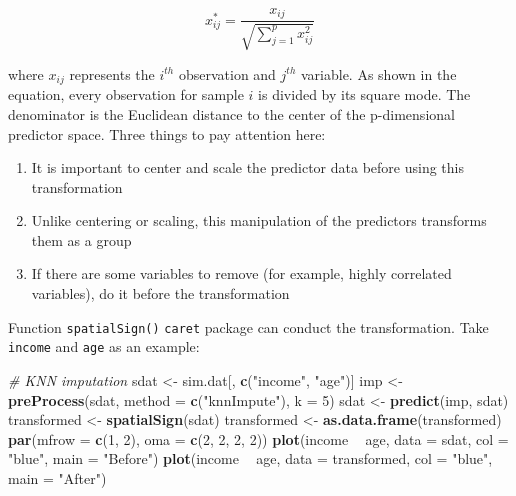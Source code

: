\documentclass[12pt,]{krantz}
\makeatletter
\newenvironment{Shaded}{\begin{snugshade}}{\end{snugshade}}
\newcommand{\CommentTok}[1]{\textcolor[rgb]{0.37,0.37,0.37}{\textit{#1}}}
\newcommand{\DataTypeTok}[1]{\textcolor[rgb]{0.27,0.27,0.27}{#1}}
\newcommand{\DecValTok}[1]{\textcolor[rgb]{0.06,0.06,0.06}{#1}}
\newcommand{\KeywordTok}[1]{\textcolor[rgb]{0.27,0.27,0.27}{\textbf{#1}}}
\newcommand{\NormalTok}[1]{#1}
\newcommand{\OperatorTok}[1]{\textcolor[rgb]{0.43,0.43,0.43}{\textbf{#1}}}
\newcommand{\StringTok}[1]{\textcolor[rgb]{0.5,0.5,0.5}{#1}}
\providecommand{\tightlist}{%
  \setlength{\itemsep}{0pt}\setlength{\parskip}{0pt}}
\newenvironment{kframe}{%
\medskip{}
\setlength{\fboxsep}{.8em}
 \def\at@end@of@kframe{}%
 \ifinner\ifhmode%
  \def\at@end@of@kframe{\end{minipage}}%
  \begin{minipage}{\columnwidth}%
 \fi\fi%
 \def\FrameCommand##1{\hskip\@totalleftmargin \hskip-\fboxsep
 \colorbox{shadecolor}{##1}\hskip-\fboxsep
     \hskip-\linewidth \hskip-\@totalleftmargin \hskip\columnwidth}%
 \MakeFramed {\advance\hsize-\width
   \@totalleftmargin\z@ \linewidth\hsize
   \@setminipage}}%
 {\par\unskip\endMakeFramed%
 \at@end@of@kframe}
\renewenvironment{Shaded}{\begin{kframe}}{\end{kframe}}
\makeatother
\begin{document}
\[x_{ij}^{*}=\frac{x_{ij}}{\sqrt{\sum_{j=1}^{p}x_{ij}^{2}}}\]

where \(x_{ij}\) represents the \(i^{th}\) observation and \(j^{th}\) variable. As shown in the equation, every observation for sample \(i\) is divided by its square mode. The denominator is the Euclidean distance to the center of the p-dimensional predictor space. Three things to pay attention here:

\begin{enumerate}
\def\labelenumi{\arabic{enumi}.}
\tightlist
\item
  It is important to center and scale the predictor data before using this transformation
\item
  Unlike centering or scaling, this manipulation of the predictors transforms them as a group
\item
  If there are some variables to remove (for example, highly correlated variables), do it before the transformation
\end{enumerate}

Function \texttt{spatialSign()} \texttt{caret} package can conduct the transformation. Take \texttt{income} and \texttt{age} as an example:

\begin{Shaded}
\begin{Highlighting}[]
\CommentTok{# KNN imputation}
\NormalTok{sdat <-}\StringTok{ }\NormalTok{sim.dat[, }\KeywordTok{c}\NormalTok{(}\StringTok{"income"}\NormalTok{, }\StringTok{"age"}\NormalTok{)]}
\NormalTok{imp <-}\StringTok{ }\KeywordTok{preProcess}\NormalTok{(sdat, }\DataTypeTok{method =} \KeywordTok{c}\NormalTok{(}\StringTok{"knnImpute"}\NormalTok{), }\DataTypeTok{k =} \DecValTok{5}\NormalTok{)}
\NormalTok{sdat <-}\StringTok{ }\KeywordTok{predict}\NormalTok{(imp, sdat)}
\NormalTok{transformed <-}\StringTok{ }\KeywordTok{spatialSign}\NormalTok{(sdat)}
\NormalTok{transformed <-}\StringTok{ }\KeywordTok{as.data.frame}\NormalTok{(transformed)}
\KeywordTok{par}\NormalTok{(}\DataTypeTok{mfrow =} \KeywordTok{c}\NormalTok{(}\DecValTok{1}\NormalTok{, }\DecValTok{2}\NormalTok{), }\DataTypeTok{oma =} \KeywordTok{c}\NormalTok{(}\DecValTok{2}\NormalTok{, }\DecValTok{2}\NormalTok{, }\DecValTok{2}\NormalTok{, }\DecValTok{2}\NormalTok{))}
\KeywordTok{plot}\NormalTok{(income }\OperatorTok{~}\StringTok{ }\NormalTok{age, }\DataTypeTok{data =}\NormalTok{ sdat, }\DataTypeTok{col =} \StringTok{"blue"}\NormalTok{, }\DataTypeTok{main =} \StringTok{"Before"}\NormalTok{)}
\KeywordTok{plot}\NormalTok{(income }\OperatorTok{~}\StringTok{ }\NormalTok{age, }\DataTypeTok{data =}\NormalTok{ transformed, }\DataTypeTok{col =} \StringTok{"blue"}\NormalTok{, }\DataTypeTok{main =} \StringTok{"After"}\NormalTok{)}
\end{Highlighting}
\end{Shaded}
\end{document}
